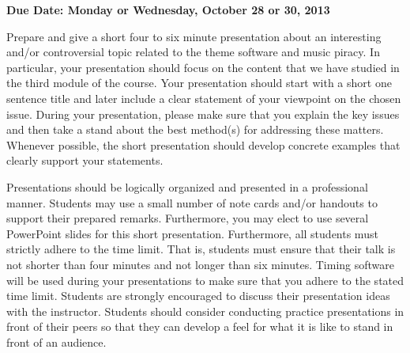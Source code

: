 

\usepackage[compact]{titlesec}



\vspace*{-.2in}
\begin{center}
	{\bf Due Date: Monday or Wednesday, October 28 or 30, 2013}
\end{center}

Prepare and give a short four to six minute presentation about an interesting and/or controversial topic related to the
theme software and music piracy. In particular, your presentation should focus on the content that we have studied in
the third module of the course. Your presentation should start with a short one sentence title and later include a clear
statement of your viewpoint on the chosen issue. During your presentation, please make sure that you explain the key
issues and then take a stand about the best method(s) for addressing these matters. Whenever possible, the short
presentation should develop concrete examples that clearly support your statements.

Presentations should be logically organized and presented in a professional manner. Students may use a small number of
note cards and/or handouts to support their prepared remarks. Furthermore, you may elect to use several PowerPoint
slides for this short presentation. Furthermore, all students must strictly adhere to the time limit. That is, students
must ensure that their talk is not shorter than four minutes and not longer than six minutes. Timing software will be
used during your presentations to make sure that you adhere to the stated time limit. Students are strongly encouraged
to discuss their presentation ideas with the instructor. Students should consider conducting practice presentations in
front of their peers so that they can develop a feel for what it is like to stand in front of an audience.


